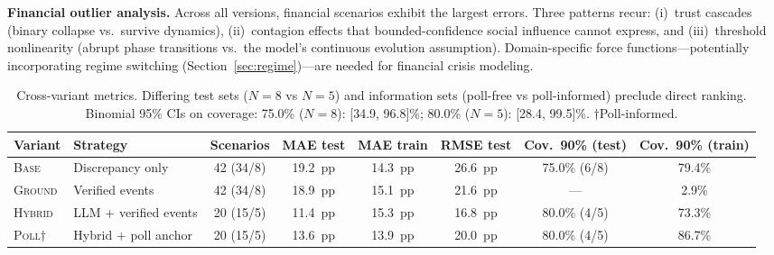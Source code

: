 \documentclass[12pt]{article}
\begin{document}
\textbf{Financial outlier analysis.} Across all versions, financial scenarios exhibit the largest errors. Three patterns recur: (i)~trust cascades (binary collapse vs.\ survive dynamics), (ii)~contagion effects that bounded-confidence social influence cannot express, and (iii)~threshold nonlinearity (abrupt phase transitions vs.\ the model's continuous evolution assumption). Domain-specific force functions---potentially incorporating regime switching (Section~\ref{sec:regime})---are needed for financial crisis modeling.

\begin{table}[H]
\centering
\caption{Cross-variant metrics. Differing test sets ($N=8$ vs $N=5$) and information sets (poll-free vs poll-informed) preclude direct ranking. Binomial 95\% CIs on coverage: 75.0\% ($N=8$): [34.9, 96.8]\%; 80.0\% ($N=5$): [28.4, 99.5]\%. $\dagger$Poll-informed.}
\label{tab:versions}
\begin{adjustbox}{max width=\textwidth}
\begin{tabular}{@{}llcccccc@{}}
\toprule
Variant & Strategy & Scenarios & MAE test & MAE train & RMSE test & Cov.\ 90\% (test) & Cov.\ 90\% (train) \\
\midrule
\textsc{Base}    & Discrepancy only      & 42 (34/8) & 19.2~pp & 14.3~pp & 26.6~pp & 75.0\% (6/8) & 79.4\% \\
\textsc{Ground}  & Verified events  & 42 (34/8) & 18.9~pp & 15.1~pp & 21.6~pp & --- & 2.9\% \\
\textsc{Hybrid}  & LLM + verified events & 20 (15/5) & 11.4~pp & 15.3~pp & 16.8~pp & 80.0\% (4/5) & 73.3\% \\
\textsc{Poll}$\dagger$ & Hybrid + poll anchor & 20 (15/5) & 13.6~pp & 13.9~pp & 20.0~pp & 80.0\% (4/5) & 86.7\% \\
\bottomrule
\end{tabular}
\end{adjustbox}
\end{table}
\end{document}
